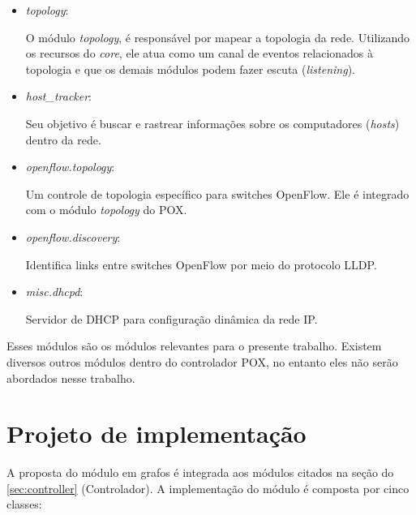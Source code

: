 \begin{itemize}

\item{\emph{topology}}: 

O módulo \emph{topology}, é responsável por mapear a topologia da rede. 
Utilizando os recursos do \emph{core}, ele atua como um canal de eventos 
relacionados à topologia e que os demais módulos podem fazer escuta 
(\emph{listening}).

\item{\emph{host\_tracker}}: 

Seu objetivo é buscar e rastrear informações sobre os computadores 
(\emph{hosts}) dentro da rede.

\item{\emph{openflow.topology}}: 

Um controle de topologia específico para switches OpenFlow.
Ele é integrado com o módulo \emph{topology} do POX.

\item{\emph{openflow.discovery}}: 

Identifica links entre switches OpenFlow por meio do protocolo LLDP.

\item{\emph{misc.dhcpd}}:

Servidor de DHCP para configuração dinâmica da rede IP.

\end{itemize}

Esses módulos são os módulos relevantes para o presente trabalho.
Existem diversos outros módulos dentro do controlador POX, no entanto
eles não serão abordados nesse trabalho.

\section{Projeto de implementação}

A proposta do módulo em grafos é integrada aos módulos citados na seção do 
\ref{sec:controller} (Controlador).
A implementação do módulo é composta por cinco classes:

